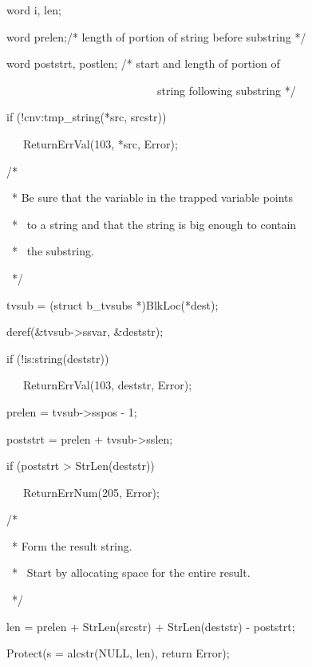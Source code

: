 {\ttfamily\mdseries
\ \ \ word i, len;}

{\ttfamily\mdseries
\ \ \ word prelen;/* length of portion of string before substring */}

{\ttfamily\mdseries
\ \ \ word poststrt, postlen; /* start and length of portion of}

{\ttfamily\mdseries
\ \ \ \ \ \ \ \ \ \ \ \ \ \ \ \ \ \ \ \ \ \ \ \ \ \ \ \ \ \ string following substring */}

{\ttfamily\mdseries
\ \ \ if (!cnv:tmp\_string(*src, srcstr))}

{\ttfamily\mdseries
\ \ \ \ \ \ ReturnErrVal(103, *src, Error);}

{\ttfamily\mdseries
\ \ \ /*}

{\ttfamily\mdseries
\ \ \ \ * Be sure that the variable in the trapped variable points}

{\ttfamily\mdseries
\ \ \ \ * \ to a string and that the string is big enough to contain}

{\ttfamily\mdseries
\ \ \ \ * \ the substring.}

{\ttfamily\mdseries
\ \ \ \ */}

{\ttfamily\mdseries
\ \ \ tvsub = (struct b\_tvsubs *)BlkLoc(*dest);}

{\ttfamily\mdseries
\ \ \ deref(\&tvsub-{\textgreater}ssvar, \&deststr);}

{\ttfamily\mdseries
\ \ \ if (!is:string(deststr))}

{\ttfamily\mdseries
\ \ \ \ \ \ ReturnErrVal(103, deststr, Error);}

{\ttfamily\mdseries
\ \ \ prelen = tvsub-{\textgreater}sspos - 1;}

{\ttfamily\mdseries
\ \ \ poststrt = prelen + tvsub-{\textgreater}sslen;}

{\ttfamily\mdseries
\ \ \ if (poststrt {\textgreater} StrLen(deststr))}

{\ttfamily\mdseries
\ \ \ \ \ \ ReturnErrNum(205, Error);}


\bigskip

{\ttfamily\mdseries
\ \ \ /*}

{\ttfamily\mdseries
\ \ \ \ * Form the result string.}

{\ttfamily\mdseries
\ \ \ \ * \ Start by allocating space for the entire result.}

{\ttfamily\mdseries
\ \ \ \ */}

{\ttfamily\mdseries
\ \ \ len = prelen + StrLen(srcstr) + StrLen(deststr) - poststrt;}

{\ttfamily\mdseries
\ \ \ Protect(s = alcstr(NULL, len), return Error);}

